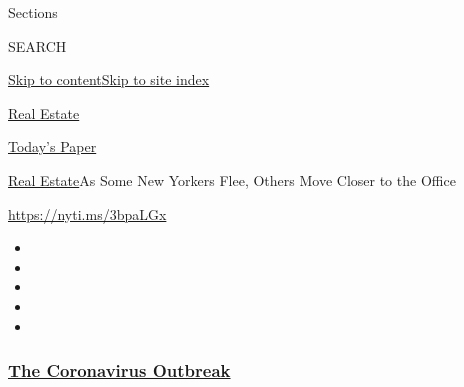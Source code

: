 Sections

SEARCH

\protect\hyperlink{site-content}{Skip to
content}\protect\hyperlink{site-index}{Skip to site index}

\href{https://www.nytimes3xbfgragh.onion/section/realestate}{Real
Estate}

\href{https://myaccount.nytimes3xbfgragh.onion/auth/login?response_type=cookie\&client_id=vi}{}

\href{https://www.nytimes3xbfgragh.onion/section/todayspaper}{Today's
Paper}

\href{/section/realestate}{Real Estate}\textbar{}As Some New Yorkers
Flee, Others Move Closer to the Office

\url{https://nyti.ms/3bpaLGx}

\begin{itemize}
\item
\item
\item
\item
\item
\end{itemize}

\hypertarget{the-coronavirus-outbreak}{%
\subsubsection{\texorpdfstring{\href{https://www.nytimes3xbfgragh.onion/news-event/coronavirus?name=styln-coronavirus-national\&region=TOP_BANNER\&block=storyline_menu_recirc\&action=click\&pgtype=Article\&impression_id=36ab9870-f1c8-11ea-b5fb-29abc66233f3\&variant=undefined}{The
Coronavirus
Outbreak}}{The Coronavirus Outbreak}}\label{the-coronavirus-outbreak}}

